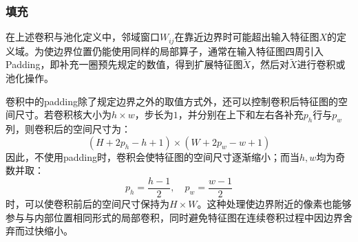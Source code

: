 \subsubsection{填充}
在上述卷积与池化定义中，邻域窗口$W_{ij}$在靠近边界时可能超出输入特征图$X$的定义域。为使边界位置仍能使用同样的局部算子，通常在输入特征图四周引入\gls{Padding}，即补充一圈预先规定的数值，得到扩展特征图$\tilde{X}$，然后对$\tilde{X}$进行卷积或池化操作。
\begin{note}
	卷积中的padding除了规定边界之外的取值方式外，还可以控制卷积后特征图的空间尺寸。若卷积核大小为$h\times w$，步长为$1$，并分别在上下和左右各补充$p_h$行与$p_w$列，则卷积后的空间尺寸为：
	\begin{equation*}
		(H+2p_h-h+1)\times(W+2p_w-w+1)
	\end{equation*}
	因此，不使用padding时，卷积会使特征图的空间尺寸逐渐缩小；而当$h,w$均为奇数并取：
	\begin{equation*}
		p_h=\frac{h-1}{2},\quad p_w=\frac{w-1}{2}
	\end{equation*}
	时，可以使卷积前后的空间尺寸保持为$H\times W$。这种处理使边界附近的像素也能够参与与内部位置相同形式的局部卷积，同时避免特征图在连续卷积过程中因边界舍弃而过快缩小。
\end{note}
